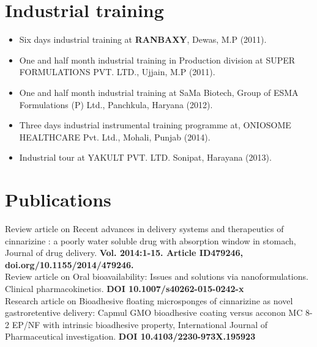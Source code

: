 \documentclass[margin,line]{res}
\begin{document}
\begin{resume}

\section{\sc Industrial training}

\begin{itemize} [leftmargin=.1in]
\setlength\itemsep{-1em}
 
\item Six days industrial training at { \bf RANBAXY}, Dewas, M.P (2011).\\
\item One and half month industrial training in Production division at SUPER FORMULATIONS PVT. LTD., Ujjain, M.P (2011). \\
\item One and half month industrial training at SaMa Biotech, Group of ESMA Formulations (P) Ltd., Panchkula, Haryana (2012).\\
\item Three days industrial instrumental training programme at, ONIOSOME HEALTHCARE Pvt. Ltd., Mohali, Punjab (2014). \\
\item Industrial tour at YAKULT PVT. LTD. Sonipat, Harayana (2013).

\end{itemize}





\section{\sc Publications}


Review article on Recent advances in delivery systems and therapeutics of cinnarizine : a poorly water soluble drug with absorption window in stomach, Journal of drug delivery. { \bf Vol. 2014:1-15. Article ID479246, doi.org/10.1155/2014/479246.} \vspace{1.5mm}\\
Review article on Oral bioavailability: Issues and solutions via nanoformulations. Clinical pharmacokinetics. { \bf DOI 10.1007/s40262-015-0242-x} \vspace{1.5mm}\\
Research article on Bioadhesive ﬂoating microsponges of cinnarizine as novel gastroretentive delivery: Capmul GMO bioadhesive coating versus acconon MC 8-2 EP/NF with intrinsic bioadhesive property, International Journal of Pharmaceutical investigation. {\bf  DOI 10.4103/2230-973X.195923} \vspace{1.5mm}\\





\end{resume}
\end{document}
